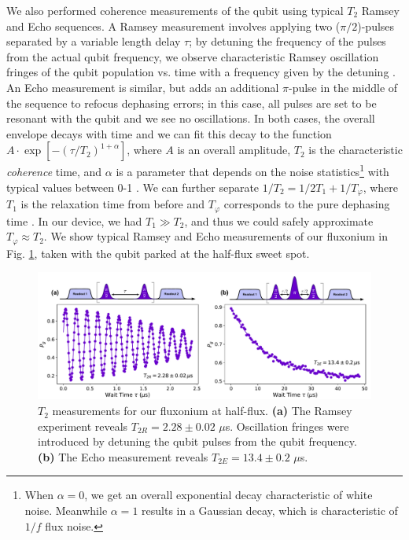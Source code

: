 We also performed coherence measurements of the qubit using typical $T_2$ Ramsey and Echo sequences. A Ramsey measurement involves applying two ($\pi/2$)-pulses separated by a variable length delay $\tau$; by detuning the frequency of the pulses from the actual qubit frequency, we observe characteristic Ramsey oscillation fringes of the qubit population vs. time with a frequency given by the detuning \cite{raimond2006exploring, krantz2019quantum, naghiloo2019introduction}. An Echo measurement is similar, but adds an additional $\pi$-pulse in the middle of the sequence to refocus dephasing errors; in this case, all pulses are set to be resonant with the qubit and we see no oscillations. In both cases, the overall envelope decays with time and we can fit this decay to the function $A\cdot\exp[-(\tau/T_2)^{1 +\alpha}]$, where $A$ is an overall amplitude, $T_2$ is the characteristic \textit{coherence} time, and $\alpha$ is a parameter that depends on the noise statistics\footnote{When $\alpha = 0$, we get an overall exponential decay characteristic of white noise. Meanwhile $\alpha=1$ results in a Gaussian decay, which is characteristic of $1/f$ flux noise.} with typical values between 0-1 \cite{ithier2005decoherence, hutchings2017tunable, didier2019ac}. We can further separate $1/T_2 = 1/2T_1 + 1/T_\varphi$, where $T_1$ is the relaxation time from before and $T_\varphi$ corresponds to the pure dephasing time \cite{krantz2019quantum}. In our device, we had $T_1 \gg T_2$, and thus we could safely approximate $T_\varphi \approx T_2$. We show typical Ramsey and Echo  measurements of our fluxonium in Fig. \ref{fig:4_T2_ramsey_echo}, taken with the qubit parked at the half-flux sweet spot. 
\begin{figure}[h]
    \centering
    \includegraphics[width=\linewidth]{Figures/4/T2_ramsey_echo.pdf}
    \caption[Qubit \texorpdfstring{$T_2$}{T2} Ramsey and Echo measurements.]{$T_2$ measurements for our fluxonium at half-flux. \textbf{(a)} The Ramsey experiment reveals $T_{2R} = 2.28 \pm 0.02$ $\mu$s. Oscillation fringes were introduced by detuning the qubit pulses from the qubit frequency. \textbf{(b)} The Echo measurement reveals $T_{2E} = 13.4 \pm 0.2$ $\mu$s. }
    \label{fig:4_T2_ramsey_echo}
\end{figure}

